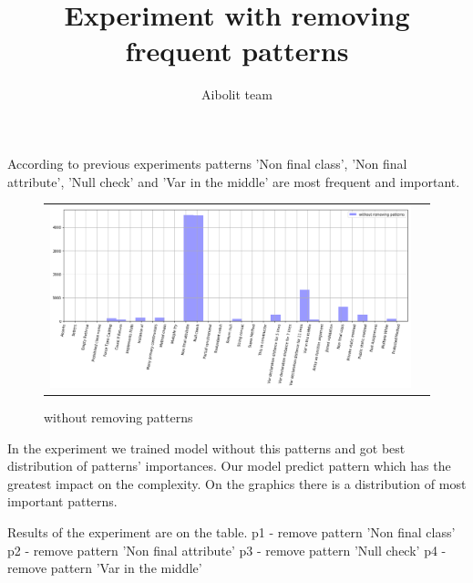 \documentclass[12pt]{article}
\title{Experiment with removing frequent patterns}
\author{Aibolit team}
\begin{document}
\maketitle
\newpage

According to previous experiments
patterns 'Non final class', 
'Non final attribute', 
'Null check' and 
'Var in the middle' 
are most frequent and important. 

\begin{figure}[h!]\center
	\begin{tabular}{cc}
		\includegraphics[scale=0.4]{3.png}
	\end{tabular}
	\caption{without removing patterns}
	\label{fig:ris3}
\end{figure}

In the experiment we trained
model without this patterns
and got best distribution of
patterns' importances. 
Our model predict pattern which
has the greatest impact on the
complexity. On the graphics
there is a distribution of 
most important
patterns. 

\newpage
Results of the experiment
are on the table.
\newline
p1 - remove pattern 'Non final class'
\newline
p2 - remove pattern 'Non final attribute'
\newline
p3 - remove pattern 'Null check'
\newline
p4 - remove pattern 'Var in the middle'
\newline
\end{document}
